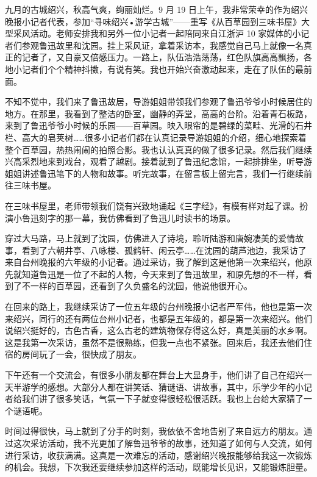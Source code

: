 \documentclass[UTF8,a4paper,titlepage,twoside,10.5pt]{article}
\begin{document}
九月的古城绍兴，秋高气爽，绚丽灿烂。9 月 19 日上午，我非常荣幸的作为绍兴晚报小记者代表，参加“寻味绍兴•游学古城”——重写《从百草园到三味书屋》大型采风活动。老师安排我和另外一位小记者一起陪同来自江浙沪 10 家媒体的小记者们参观鲁迅故里和沈园。挂上采风证，拿着采访本，我感觉自己马上就像一名真正的记者了，又自豪又倍感压力。一路上，队伍浩浩荡荡，红色队旗高高飘扬，各地小记者们个个精神抖擞，有说有笑。我也开始兴奋激动起来，走在了队伍的最前面。

不知不觉中，我们来了鲁迅故居，导游姐姐带领我们参观了鲁迅爷爷小时候居住的地方。在那里，我看到了整洁的卧室，幽静的弄堂，高高的台阶。沿着青石板路，来到了鲁迅爷爷小时候的乐园——百草园。映入眼帘的是碧绿的菜畦、光滑的石井栏、高大的皂荚树……很多小记者们都在认真记录导游姐姐的介绍，细心地探索着整个百草园，热热闹闹的拍照合影。我也认认真真的做了很多记录。然后我们继续兴高采烈地来到戏台，观看了越剧。接着就到了鲁迅纪念馆，一起排排坐，听导游姐姐讲述鲁迅笔下的人物和故事。听完故事，在留言板上留完言，我们一行继续前往三味书屋。

在三味书屋里，老师带领我们饶有兴致地诵起《三字经》，有模有样对起了课。扮演小鲁迅刻字的那一幕，我仿佛看到了鲁迅儿时读书的场景。

穿过大马路，马上就到了沈园，仿佛进入了诗境，聆听陆游和唐婉凄美的爱情故事，看到了六朝井亭、八咏楼、孤鹤轩、闲云亭……在沈园的葫芦池边，我采访了来自台州晚报的六年级的小记者。通过采访，我了解到这是他第一次来绍兴，他原先就知道鲁迅是一位了不起的人物，今天来到了鲁迅故里，和原先想的不一样，看到了不一样的百草园，还看到了久负盛名的沈园，他说他很开心。

在回来的路上，我继续采访了一位五年级的台州晚报小记者严军伟，他也是第一次来绍兴，同行的还有两位台州小记者，也都是五年级的，都是第一次来绍兴。他们说绍兴挺好的，古色古香，这么古老的建筑物保存得这么好，真是美丽的水乡啊。这是我第一次采访，虽然不是很熟练，但我一点也不紧张。回来后，我还去他们住宿的房间玩了一会，很快成了朋友。

下午还有一个交流会，有很多小朋友都在舞台上大显身手，他们讲了自己在绍兴一天半游学的感想。大部分人都在讲笑话、猜谜语、讲故事，其中，乐学少年的小记者给我们讲了很多笑话，气氛一下子就变得很轻松很活跃。我也上台给大家猜了一个谜语呢。

时间过得很快，马上就到了分手的时刻，我依依不舍地告别了来自远方的朋友。通过这次采访活动，我不光更加了解鲁迅爷爷的故事，还知道了如何与人交流，如何进行采访，收获满满。这真是一次难忘的活动，感谢绍兴晚报能够给我这一次锻炼的机会。我想，下次我还要继续参加这样的活动，既能增长见识，又能锻炼胆量。

\vspace*{\baselineskip}
\end{document}
